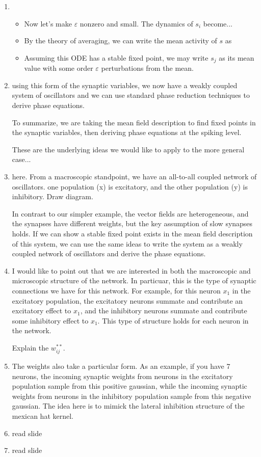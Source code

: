 \documentclass[a4paper,14pt]{article}
\newcommand{\ve}{\varepsilon}
\begin{document}
\begin{enumerate}
\item 
\begin{itemize}
 \item Now let's make $\ve$ nonzero and small. The dynamics of $s_i$ become...
 \item By the theory of averaging, we can write the mean activity of $s$ as
 \item Assuming this ODE has a stable fixed point, we may write $s_j$ as its mean value with some order $\ve$ perturbations from the mean.
\end{itemize}

\item using this form of the synaptic variables, we now have a weakly coupled system of oscillators and we can use standard phase reduction techniques to derive phase equations.

To summarize, we are taking the mean field description to find fixed points in the synaptic variables, then deriving phase equations at the spiking level.

These are the underlying ideas we would like to apply to the more general case...

\item here. From a macroscopic standpoint, we have an all-to-all coupled network of oscillators. one population (x) is excitatory, and the other population (y) is inhibitory. Draw diagram.

In contrast to our simpler example, the vector fields are heterogeneous, and the synapses have different weights, but the key assumption of slow synapses holds. If we can show a stable fixed point exists in the mean field description of this system, we can use the same ideas to write the system as a weakly coupled network of oscillators and derive the phase equations.

\item I would like to point out that we are interested in both the macroscopic and microscopic structure of the network. In particuar, this is the type of synaptic connections we have for this network. For example, for this neuron $x_1$ in the excitatory population, the excitatory neurons summate and contribute an excitatory effect to $x_1$, and the inhibitory neurons summate and contribute some inhibitory effect to $x_1$. This type of structure holds for each neuron in the network.

Explain the $w_{ij}^{**}$.

\item The weights also take a particular form. As an example, if you have 7 neurons, the incoming synaptic weights from neurons in the excitatory population sample from this positive gaussian, while the incoming synaptic weights from neurons in the inhibitory population sample from this negative gaussian. The idea here is to mimick the lateral inhibition structure of the mexican hat kernel.

\item read slide

\item read slide

\end{enumerate}
\end{document}
